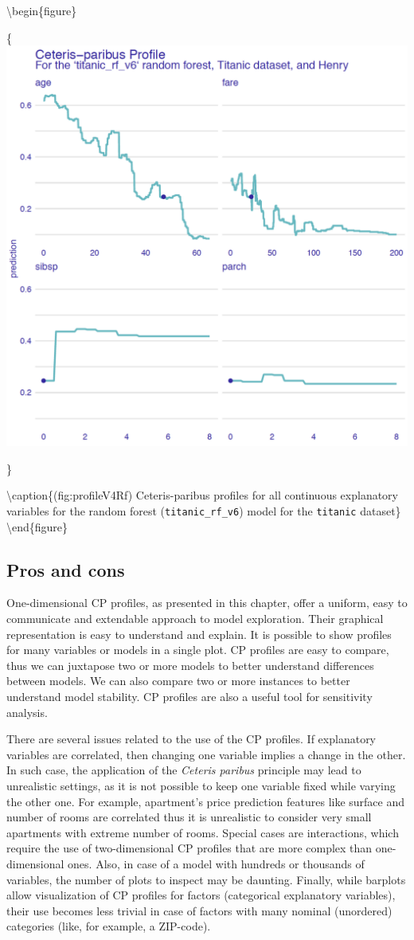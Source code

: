 \documentclass[12pt,]{krantz}
\begin{document}
\textbackslash{}begin\{figure\}

\{\centering \includegraphics[width=0.7\linewidth]{figure/profile_v4_rf3}

\}

\textbackslash{}caption\{(fig:profileV4Rf) Ceteris-paribus profiles for all continuous explanatory variables for the random forest (\texttt{titanic\_rf\_v6}) model for the \texttt{titanic} dataset\}\label{fig:profileV4Rf}
\textbackslash{}end\{figure\}

\hypertarget{CPProsCons}{%
\subsection{Pros and cons}\label{CPProsCons}}

One-dimensional CP profiles, as presented in this chapter, offer a uniform, easy to communicate and extendable approach to model exploration. Their graphical representation is easy to understand and explain. It is possible to show profiles for many variables or models in a single plot. CP profiles are easy to compare, thus we can juxtapose two or more models to better understand differences between models. We can also compare two or more instances to better understand model stability. CP profiles are also a useful tool for sensitivity analysis.

There are several issues related to the use of the CP profiles. If explanatory variables are correlated, then changing one variable implies a change in the other. In such case, the application of the \emph{Ceteris paribus} principle may lead to unrealistic settings, as it is not possible to keep one variable fixed while varying the other one. For example, apartment's price prediction features like surface and number of rooms are correlated thus it is unrealistic to consider very small apartments with extreme number of rooms. Special cases are interactions, which require the use of two-dimensional CP profiles that are more complex than one-dimensional ones. Also, in case of a model with hundreds or thousands of variables, the number of plots to inspect may be daunting. Finally, while barplots allow visualization of CP profiles for factors (categorical explanatory variables), their use becomes less trivial in case of factors with many nominal (unordered) categories (like, for example, a ZIP-code).
\end{document}
